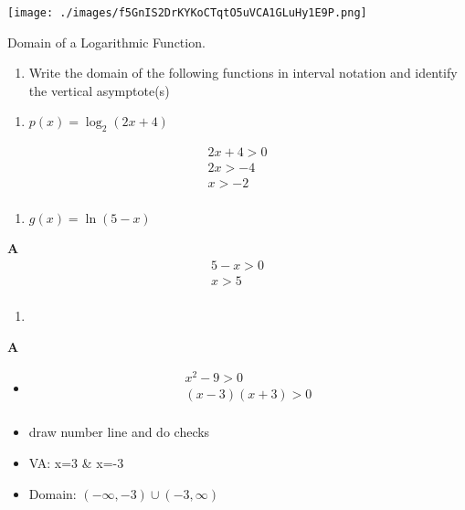\documentclass{book}
\begin{document}
\texttt{[image: ./images/f5GnIS2DrKYKoCTqtO5uVCA1GLuHy1E9P.png]}

Domain of a Logarithmic Function.

\begin{enumerate}
	\def\labelenumi{\arabic{enumi}.}
	\setcounter{enumi}{13}
	\tightlist
	\item
	      Write the domain of the following functions in interval notation and
	      identify the vertical asymptote(s)
\end{enumerate}

\begin{enumerate}
	\def\labelenumi{\alph{enumi}.}
	\tightlist
	\item
	      \(p(x)=\log_{2}\left(2x+4\right)\)
\end{enumerate}

\begin{align}
		2x+4 > 0 \\ 2x > -4 \\ x > -2 \\
	\end{align}

\begin{enumerate}
	\def\labelenumi{\alph{enumi}.}
	\setcounter{enumi}{1}
	\tightlist
	\item
	      \(g(x)=\ln{(5-x)}\)
\end{enumerate}

\textbf{A} \begin{align}
		5-x > 0 \\ x > 5 \\
	\end{align}

\begin{enumerate}
	\def\labelenumi{\alph{enumi}.}
	\setcounter{enumi}{2}
	\tightlist
	\item
\end{enumerate}

\textbf{A}

\begin{itemize}
	\tightlist
	\item
	      \begin{align}
			      x^2-9 >0 \\ (x-3)(x+3) > 0 \\
		      \end{align}
	\item
	      draw number line and do checks
	\item
	      VA: x=3 \& x=-3
	\item
	      Domain: \((-\infty,-3)\cup(-3,\infty)\)
\end{itemize}
\end{document}
